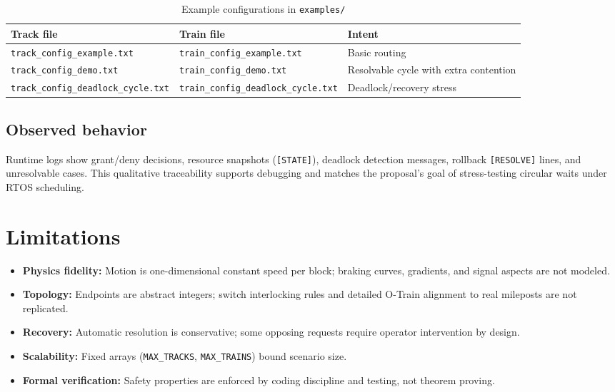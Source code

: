 \documentclass[11pt,a4paper]{article}
\begin{document}
\begin{table}[htbp]
  \centering
  \caption{Example configurations in \texttt{examples/}}
  \label{tab:examples}
  \begin{tabular}{@{}llp{7.2cm}@{}}
    \toprule
    \textbf{Track file} & \textbf{Train file} & \textbf{Intent} \\
    \midrule
    \texttt{track\_config\_example.txt} & \texttt{train\_config\_example.txt} & Basic routing \\
    \texttt{track\_config\_demo.txt} & \texttt{train\_config\_demo.txt} & Resolvable cycle with extra contention \\
    \texttt{track\_config\_deadlock\_cycle.txt} & \texttt{train\_config\_deadlock\_cycle.txt} & Deadlock/recovery stress \\
    \bottomrule
  \end{tabular}
\end{table}

\subsection{Observed behavior}
Runtime logs show grant/deny decisions, resource snapshots (\texttt{[STATE]}), deadlock detection messages, rollback \texttt{[RESOLVE]} lines, and unresolvable cases. This qualitative traceability supports debugging and matches the proposal's goal of stress-testing circular waits under RTOS scheduling.

\section{Limitations}

\begin{itemize}[noitemsep]
  \item \textbf{Physics fidelity:} Motion is one-dimensional constant speed per block; braking curves, gradients, and signal aspects are not modeled.
  \item \textbf{Topology:} Endpoints are abstract integers; switch interlocking rules and detailed O-Train alignment to real mileposts are not replicated.
  \item \textbf{Recovery:} Automatic resolution is conservative; some opposing requests require operator intervention by design.
  \item \textbf{Scalability:} Fixed arrays (\texttt{MAX\_TRACKS}, \texttt{MAX\_TRAINS}) bound scenario size.
  \item \textbf{Formal verification:} Safety properties are enforced by coding discipline and testing, not theorem proving.
\end{itemize}
\end{document}
